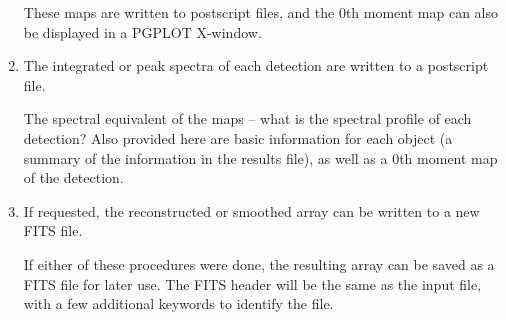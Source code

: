 \begin{enumerate}
  These maps are written to postscript files, and the 0th moment map
  can also be displayed in a PGPLOT X-window.

\item The integrated or peak spectra of each detection are written to a
  postscript file. 

  The spectral equivalent of the maps -- what is the spectral profile
  of each detection? Also provided here are basic information for each
  object (a summary of the information in the results file), as well
  as a 0th moment map of the detection.

\item If requested, the reconstructed or smoothed array can be written
  to a new FITS file.

  If either of these procedures were done, the resulting array can be
  saved as a FITS file for later use. The FITS header will be the same
  as the input file, with a few additional keywords to identify the
  file. 

\end{enumerate}

